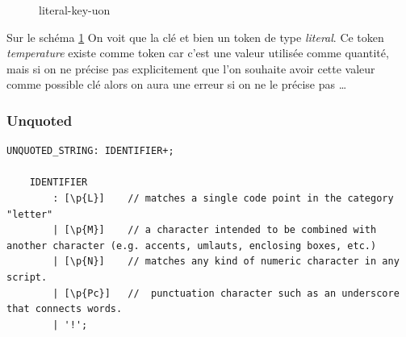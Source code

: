 \documentclass[
    iict, %
    il, %
]{heig-tb}
\begin{document}
\begin{figure}[!h]
    \begin{center}
    \end{center}
    \caption[literal-key-uon]{\label{literal-key-uon}literal-key-uon}
\end{figure}

Sur le schéma \ref*{literal-key-uon} On voit que la clé et bien un token de type \emph{literal}.
Ce token \emph{temperature} existe comme token car c'est une valeur utilisée comme quantité, mais si on ne précise pas explicitement que l'on souhaite avoir cette valeur
comme possible clé alors on aura une erreur si on ne le précise pas \dots %

\subsubsection{Unquoted}

\begin{lstlisting}[frame=single,caption={unquoted},label={unquoted}]
    UNQUOTED_STRING: IDENTIFIER+;

    IDENTIFIER
        : [\p{L}]    // matches a single code point in the category "letter"
        | [\p{M}]    // a character intended to be combined with another character (e.g. accents, umlauts, enclosing boxes, etc.)
        | [\p{N}]    // matches any kind of numeric character in any script.
        | [\p{Pc}]   //  punctuation character such as an underscore that connects words.
        | '!';
\end{lstlisting}
\end{document}
